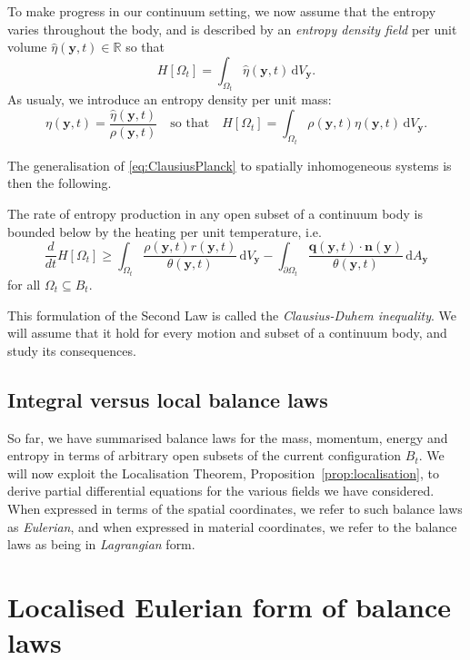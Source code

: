 \documentclass[
  letterpaper,
  DIV=11,
  numbers=noendperiod]{scrreprt}
\theoremstyle{plain}
\theoremstyle{remark}
\begin{document}
To make progress in our continuum setting, we now assume that the
entropy varies throughout the body, and is described by an \emph{entropy
density field} per unit volume
\(\hat{\eta}({\boldsymbol{y}},t)\in{\mathbb{R}}\) so that
\[H[\Omega_t] = \int_{\Omega_t}\hat{\eta}({\boldsymbol{y}},t){\,{\mathrm{d}}V_{{\boldsymbol{y}}}}.\]
As usualy, we introduce an entropy density per unit mass:
\[\eta({\boldsymbol{y}},t) = \frac{\hat{\eta}({\boldsymbol{y}},t)}{\rho({\boldsymbol{y}},t)}\quad\text{so that}\quad H[\Omega_t] = \int_{\Omega_t}\rho({\boldsymbol{y}},t)\eta({\boldsymbol{y}},t){\,{\mathrm{d}}V_{{\boldsymbol{y}}}}.\]

The generalisation of
\hyperref[eq:ClausiusPlanck]{{[}eq:ClausiusPlanck{]}} to spatially
inhomogeneous systems is then the following.

\label{ax:2ndLaw}{} The rate of entropy production in any
open subset of a continuum body is bounded below by the heating per unit
temperature, i.e.
\[\frac{d}{dt}H[\Omega_t] \geq \int_{\Omega_t}\frac{\rho({\boldsymbol{y}},t)r({\boldsymbol{y}},t)}{\theta({\boldsymbol{y}},t)}{\,{\mathrm{d}}V_{{\boldsymbol{y}}}}-\int_{\partial \Omega_t}\frac{{\boldsymbol{q}}({\boldsymbol{y}},t)\cdot{\boldsymbol{n}}({\boldsymbol{y}})}{\theta({\boldsymbol{y}},t)}{\,{\mathrm{d}}A_{{\boldsymbol{y}}}}\]
for all \(\Omega_t\subseteq B_t\).

This formulation of the Second Law is called the \emph{Clausius-Duhem
inequality}. We will assume that it hold for every motion and subset of
a continuum body, and study its consequences.

\subsection{Integral versus local balance
laws}\label{integral-versus-local-balance-laws}

So far, we have summarised balance laws for the mass, momentum, energy
and entropy in terms of arbitrary open subsets of the current
configuration \(B_t\). We will now exploit the Localisation Theorem,
Proposition~\hyperref[prop:localisation]{{[}prop:localisation{]}}, to
derive partial differential equations for the various fields we have
considered. When expressed in terms of the spatial coordinates, we refer
to such balance laws as \emph{Eulerian}, and when expressed in material
coordinates, we refer to the balance laws as being in \emph{Lagrangian}
form.

\section{Localised Eulerian form of balance
laws}\label{localised-eulerian-form-of-balance-laws}
\end{document}
